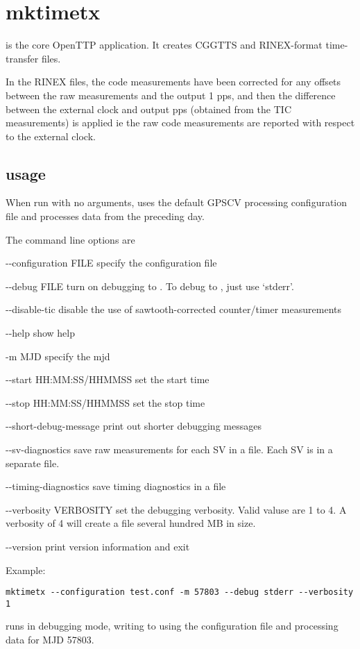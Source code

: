 
\section{mktimetx}

\hypertarget{h:mktimetx}{}

 is the core OpenTTP application.
It creates CGGTTS and RINEX-format time-transfer files.

In the RINEX files, the code measurements have been corrected for any offsets between the raw measurements
and the output 1 pps, and then the difference between the external clock and output pps (obtained from the TIC measurements)
is applied ie the raw code measurements are reported with respect to the external clock.

\subsection{usage}

When run with no arguments,  uses the default GPSCV processing configuration file 
 and processes data from the preceding day.

The command line options are
\begin{description*}
	\item[-{}-configuration FILE] specify the configuration file
	\item[-{}-debug FILE]	turn on debugging to . To debug to , just use `stderr'.
	\item[-{}-disable-tic] disable the use of sawtooth-corrected counter/timer measurements 
	\item[-{}-help] show help
	\item[-m MJD] specify the mjd
	\item[-{}-start] HH:MM:SS/HHMMSS  set the start time
	\item[-{}-stop]  HH:MM:SS/HHMMSS  set the stop time
	\item[-{}-short-debug-message] print out shorter debugging messages
	\item[-{}-sv-diagnostics] save raw measurements for each SV in a file. Each SV is in a separate file.
	\item[-{}-timing-diagnostics] save timing diagnostics in a file
	\item[-{}-verbosity VERBOSITY] set the debugging verbosity. Valid valuse are 1 to 4. A verbosity of 4 will create a file several  hundred MB in size.
	\item[-{}-version] print version information	and exit
\end{description*}
Example:
\begin{lstlisting}
mktimetx --configuration test.conf -m 57803 --debug stderr --verbosity 1 
\end{lstlisting}
runs  in debugging mode, writing to  using the configuration file  and processing
data for MJD 57803.

